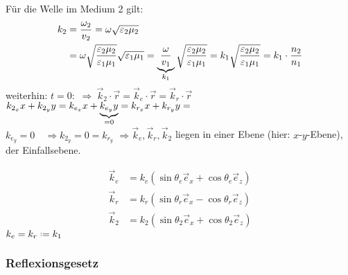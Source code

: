 \begin{enumerate}
	Für die Welle im Medium 2 gilt:
	\begin{align*}
	k_2 &= \frac{\omega_2}{v_2} = \omega \sqrt{\varepsilon_2 \mu_2} \\
	&= \omega \sqrt{\frac{\varepsilon_2 \mu_2}{\varepsilon_1 \mu_1}} \sqrt{\varepsilon_1 \mu_1} = \underbrace{\frac{\omega}{v_1}}_{k_1} \sqrt{\frac{\varepsilon_2 \mu_2}{\varepsilon_1 \mu_1}} = 	k_1 \sqrt{\frac{\varepsilon_2 \mu_2}{\varepsilon_1 \mu_1}} = k_1 \cdot \frac{n_2}{n_1}
	\end{align*}
	weiterhin:
	$ t=0 : $ $ \Rightarrow \ \vec{k}_2 \cdot \vec{r} = \vec{k}_e \cdot \vec{r} = \vec{k}_r \cdot \vec{r} $\\[5pt]
	$ k_{2_x} x + k_{2_y} y = k_{e_x} x + \underbrace{k_{e_y} y}_{=0} = k_{r_x} x + k_{r_y} y =   $\\[5pt]
	$ k_{e_y} = 0 \quad \Rightarrow k_{2_y} = 0 = k_{r_y}$
	$ \Rightarrow \vec{k}_e, \vec{k}_r, \vec{k}_2 $ liegen in einer Ebene (hier: $ x $-$ y $-Ebene), der Einfallsebene.\\
	\begin{minipage}{.5\linewidth}
		\begin{align*}
		\vec{k}_e &= k_e (\sin \theta_e \vec{e}_x + \cos \theta _e \vec{e}_z)\\
		\vec{k}_r &= k_r (\sin \theta_r \vec{e}_x - \cos \theta _r \vec{e}_z)\\
		\vec{k}_2 &= k_2 (\sin \theta_2 \vec{e}_x + \cos \theta _2 \vec{e}_z)
		\end{align*}
		$ k_e = k_r \defeq k_1 $
	\end{minipage}%
	\begin{minipage}{.5\linewidth}
		\flushright
	\end{minipage}%

\end{enumerate}

\subsubsection{Reflexionsgesetz}

